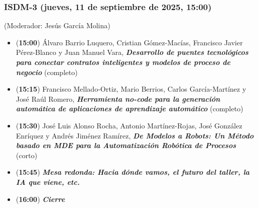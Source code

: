 \begin{frame}
  \frametitle{ISDM-3 (jueves, 11 de septiembre de 2025, 15:00)}
{\small (Moderador: Jesús García Molina)}
\begin{itemize}

  \item ({\bf 15:00}) Álvaro Barrio Luquero, Cristian Gómez-Macías, Francisco Javier Pérez-Blanco y Juan Manuel Vara, %
        {\bfseries\itshape Desarrollo de puentes tecnológicos para conectar contratos inteligentes y modelos de proceso de negocio} %
        (completo)

  \item ({\bf 15:15}) Francisco Mellado-Ortiz, Mario Berrios, Carlos García-Martínez y José Raúl Romero, %
        {\bfseries\itshape Herramienta no-code para la generación automática de aplicaciones de aprendizaje automático} %
        (completo)

  \item ({\bf 15:30}) José Luis Alonso Rocha, Antonio Martínez-Rojas, José González Enríquez y Andrés Jiménez Ramírez, %
        {\bfseries\itshape De Modelos a Robots: Un Método basado en MDE para la Automatización Robótica de Procesos} %
        (corto)

  \item ({\bf 15:45}) {\bfseries\itshape Mesa redonda: Hacia dónde vamos, el futuro del taller, la IA que viene, etc.}

  \item ({\bf 16:00}) {\bfseries\itshape Cierre}

\end{itemize}
\end{frame}